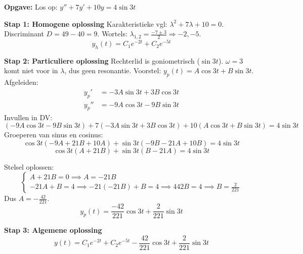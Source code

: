 \begin{oefenblok}
\textbf{Opgave:} Los op: $y'' + 7y' + 10y = 4\sin 3t$

\textbf{Stap 1: Homogene oplossing}
Karakteristieke vgl: $\lambda^2 + 7\lambda + 10 = 0$.
Discriminant $D = 49 - 40 = 9$. Wortels: $\lambda_{1,2} = \frac{-7 \pm 3}{2} \Rightarrow -2, -5$.
\[ y_h(t) = C_1 e^{-2t} + C_2 e^{-5t} \]

\textbf{Stap 2: Particuliere oplossing}
Rechterlid is goniometrisch ($\sin 3t$). $\omega=3$ komt niet voor in $\lambda$, dus geen resonantie.
Voorstel: $y_p(t) = A \cos 3t + B \sin 3t$.
Afgeleiden:
\begin{align*}
y_p' &= -3A \sin 3t + 3B \cos 3t \\
y_p'' &= -9A \cos 3t - 9B \sin 3t
\end{align*}
Invullen in DV:
\[ (-9A \cos 3t - 9B \sin 3t) + 7(-3A \sin 3t + 3B \cos 3t) + 10(A \cos 3t + B \sin 3t) = 4 \sin 3t \]
Groeperen van sinus en cosinus:
\[ \cos 3t (-9A + 21B + 10A) + \sin 3t (-9B - 21A + 10B) = 4 \sin 3t \]
\[ \cos 3t (A + 21B) + \sin 3t (B - 21A) = 4 \sin 3t \]

Stelsel oplossen:
\[
\begin{cases}
A + 21B = 0 \implies A = -21B \\
-21A + B = 4 \implies -21(-21B) + B = 4 \implies 442B = 4 \implies B = \frac{2}{221}
\end{cases}
\]
Dus $A = -\frac{42}{221}$.
\[ \boxed{y_p(t) = \frac{-42}{221} \cos 3t + \frac{2}{221} \sin 3t} \]

\textbf{Stap 3: Algemene oplossing}
\[ \boxed{y(t) = C_1 e^{-2t} + C_2 e^{-5t} - \frac{42}{221} \cos 3t + \frac{2}{221} \sin 3t} \]
\end{oefenblok}

